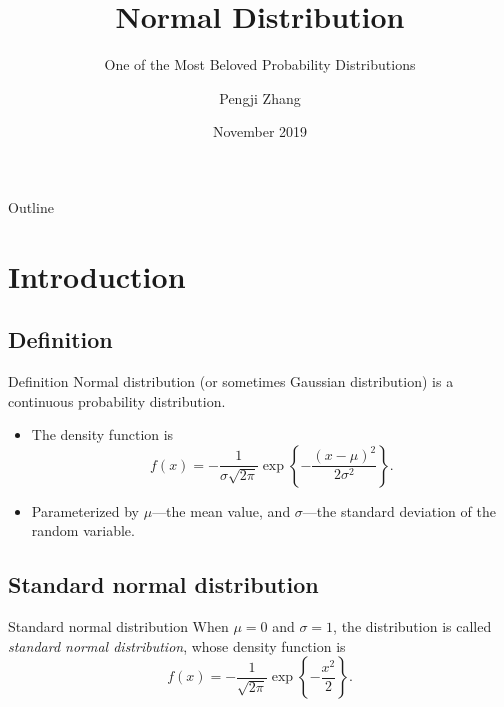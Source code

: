 \documentclass{beamer}
\title{Normal Distribution}
\subtitle{One of the Most Beloved Probability Distributions}
\author{Pengji Zhang}
\institute{Carnegie Mellon University}
\date{November 2019}
\begin{document}
\begin{frame}
  \titlepage{}
\end{frame}

\begin{frame}{Outline}
  \tableofcontents
\end{frame}

\section{Introduction}

\subsection{Definition}

\begin{frame}{Definition}
  Normal distribution (or sometimes Gaussian distribution) is a continuous
  probability distribution.
  \begin{itemize}
  \item<1-> The density function is
    \begin{equation}
      f(x) = -\frac{1}{\sigma\sqrt{2\pi}}\exp\left\{-\frac{{\left(x -
              \mu\right)}^{2}}{2\sigma^{2}}\right\}.
    \end{equation}
  \item<2-> Parameterized by \(\mu\)---the mean value, and \(\sigma\)---the
    standard deviation of the random variable.
  \end{itemize}
\end{frame}

\subsection{Standard normal distribution}

\begin{frame}{Standard normal distribution}
  When \(\mu = 0\) and \(\sigma = 1\), the distribution is called
  \emph{standard normal distribution}, whose density function is
  \begin{equation}
    f(x) = -\frac{1}{\sqrt{2\pi}}\exp\left\{-\frac{x^{2}}{2}\right\}.
  \end{equation}
\end{frame}
\end{document}
